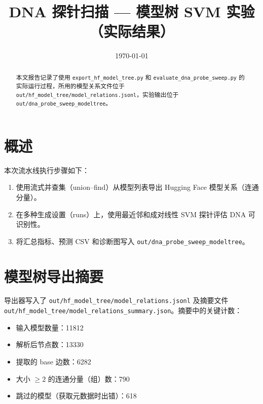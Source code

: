 \documentclass[11pt,a4paper]{article}
\title{DNA 探针扫描 — 模型树 SVM 实验（实际结果）}
\author{}
\date{\today}
\begin{document}
\maketitle

\begin{abstract}
本文报告记录了使用 \texttt{export\_hf\_model\_tree.py} 和
\texttt{evaluate\_dna\_probe\_sweep.py} 的实际运行过程，所用的模型关系文件位于
\texttt{out/hf\_model\_tree/model\_relations.jsonl}，实验输出位于
\texttt{out/dna\_probe\_sweep\_modeltree}。
\end{abstract}

\section{概述}
本次流水线执行步骤如下：
\begin{enumerate}
  \item 使用流式并查集（union--find）从模型列表导出 Hugging Face 模型关系（连通分量）。
  \item 在多种生成设置（runs）上，使用最近邻和成对线性 SVM 探针评估 DNA 可识别性。
  \item 将汇总指标、预测 CSV 和诊断图写入 \texttt{out/dna\_probe\_sweep\_modeltree}。
\end{enumerate}

\section{模型树导出摘要}
导出器写入了 \texttt{out/hf\_model\_tree/model\_relations.jsonl} 及摘要文件
\texttt{out/hf\_model\_tree/model\_relations\_summary.json}。摘要中的关键计数：
\begin{itemize}
  \item 输入模型数量：11812
  \item 解析后节点数：13330
  \item 提取的 base 边数：6282
  \item 大小 $\ge2$ 的连通分量（组）数：790
  \item 跳过的模型（获取元数据时出错）：618
\end{itemize}
\end{document}
